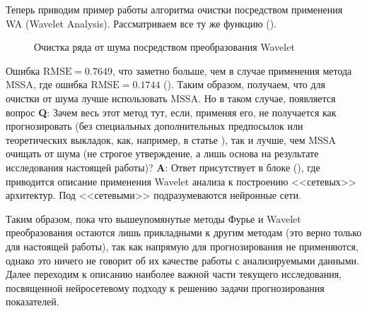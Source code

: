 Теперь приводим пример работы алгоритма очистки посредством применения WA (Wavelet Analysis). Рассматриваем все ту же функцию ().
\begin{figure}[H]
	\centering
	\caption{Очистка ряда от шума посредством преобразования Wavelet}
\end{figure}
Ошибка $\text{RMSE} = 0.7649$, что заметно больше, чем в случае применения метода MSSA, где ошибка $\text{RMSE} = 0.1744$ (). Таким образом, получаем, что для очистки от шума лучше использовать MSSA. Но в таком случае, появляется вопрос \textbf{Q}: Зачем весь этот метод тут, если, применяя его, не получается как прогнозировать (без специальных дополнительных предпосылок или теоретических выкладок, как, например, в статье \cite{schluter2010using}), так и лучше, чем MSSA очищать от шума (не строгое утверждение, а лишь основа на результате исследования настоящей работы)? \textbf{A}: Ответ присутствует в блоке (), где приводится описание применения Wavelet анализа к построению <<сетевых>> архитектур. Под <<сетевыми>> подразумеваются нейронные сети.

Таким образом, пока что вышеупомянутые методы Фурье и Wavelet преобразования остаются лишь прикладными к другим методам (это верно только для настоящей работы), так как напрямую для прогнозирования не применяются, однако это ничего не говорит об их качестве работы с анализируемыми данными. Далее переходим к описанию наиболее важной части текущего исследования, посвященной нейросетевому подходу к решению задачи прогнозирования показателей.